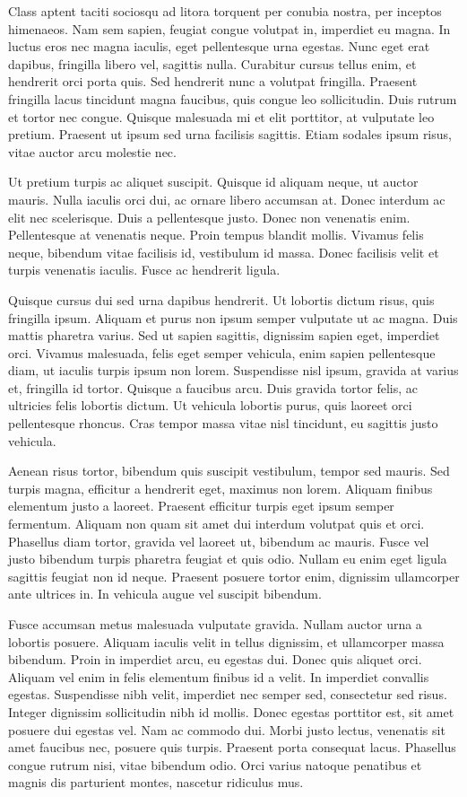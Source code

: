 Class aptent taciti sociosqu ad litora torquent per conubia nostra, per inceptos himenaeos. Nam sem sapien, feugiat congue volutpat in, imperdiet eu magna. In luctus eros nec magna iaculis, eget pellentesque urna egestas. Nunc eget erat dapibus, fringilla libero vel, sagittis nulla. Curabitur cursus tellus enim, et hendrerit orci porta quis. Sed hendrerit nunc a volutpat fringilla. Praesent fringilla lacus tincidunt magna faucibus, quis congue leo sollicitudin. Duis rutrum et tortor nec congue. Quisque malesuada mi et elit porttitor, at vulputate leo pretium. Praesent ut ipsum sed urna facilisis sagittis. Etiam sodales ipsum risus, vitae auctor arcu molestie nec.

Ut pretium turpis ac aliquet suscipit. Quisque id aliquam neque, ut auctor mauris. Nulla iaculis orci dui, ac ornare libero accumsan at. Donec interdum ac elit nec scelerisque. Duis a pellentesque justo. Donec non venenatis enim. Pellentesque at venenatis neque. Proin tempus blandit mollis. Vivamus felis neque, bibendum vitae facilisis id, vestibulum id massa. Donec facilisis velit et turpis venenatis iaculis. Fusce ac hendrerit ligula.

Quisque cursus dui sed urna dapibus hendrerit. Ut lobortis dictum risus, quis fringilla ipsum. Aliquam et purus non ipsum semper vulputate ut ac magna. Duis mattis pharetra varius. Sed ut sapien sagittis, dignissim sapien eget, imperdiet orci. Vivamus malesuada, felis eget semper vehicula, enim sapien pellentesque diam, ut iaculis turpis ipsum non lorem. Suspendisse nisl ipsum, gravida at varius et, fringilla id tortor. Quisque a faucibus arcu. Duis gravida tortor felis, ac ultricies felis lobortis dictum. Ut vehicula lobortis purus, quis laoreet orci pellentesque rhoncus. Cras tempor massa vitae nisl tincidunt, eu sagittis justo vehicula.

Aenean risus tortor, bibendum quis suscipit vestibulum, tempor sed mauris. Sed turpis magna, efficitur a hendrerit eget, maximus non lorem. Aliquam finibus elementum justo a laoreet. Praesent efficitur turpis eget ipsum semper fermentum. Aliquam non quam sit amet dui interdum volutpat quis et orci. Phasellus diam tortor, gravida vel laoreet ut, bibendum ac mauris. Fusce vel justo bibendum turpis pharetra feugiat et quis odio. Nullam eu enim eget ligula sagittis feugiat non id neque. Praesent posuere tortor enim, dignissim ullamcorper ante ultrices in. In vehicula augue vel suscipit bibendum.

Fusce accumsan metus malesuada vulputate gravida. Nullam auctor urna a lobortis posuere. Aliquam iaculis velit in tellus dignissim, et ullamcorper massa bibendum. Proin in imperdiet arcu, eu egestas dui. Donec quis aliquet orci. Aliquam vel enim in felis elementum finibus id a velit. In imperdiet convallis egestas. Suspendisse nibh velit, imperdiet nec semper sed, consectetur sed risus. Integer dignissim sollicitudin nibh id mollis. Donec egestas porttitor est, sit amet posuere dui egestas vel. Nam ac commodo dui. Morbi justo lectus, venenatis sit amet faucibus nec, posuere quis turpis. Praesent porta consequat lacus. Phasellus congue rutrum nisi, vitae bibendum odio. Orci varius natoque penatibus et magnis dis parturient montes, nascetur ridiculus mus.


